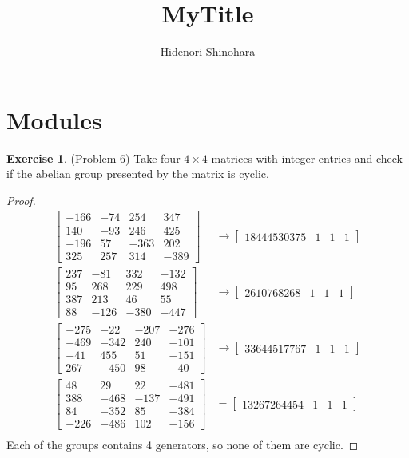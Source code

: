 \documentclass[12pt, psamsfonts]{amsart}
\theoremstyle{definition}
\newtheorem*{exer}{Exercise}
\theoremstyle{remark}
\numberwithin{equation}{section}
\begin{document}
\title{MyTitle}
\author{Hidenori Shinohara}
\maketitle

\tableofcontents

\section{Modules}

\begin{exer}{(Problem 6)}
  Take four $4 \times 4$ matrices with integer entries and check if the abelian group presented by the matrix is cyclic.
\end{exer}

\begin{proof}
  \begin{align*}
    \begin{bmatrix} -166 & -74 & 254 & 347\\ 140 & -93 & 246 & 425\\ -196 & 57 & -363 & 202\\ 325 & 257 & 314 & -389 \end{bmatrix}
      &\rightarrow \begin{bmatrix} 18444530375 & 1 & 1 & 1 \end{bmatrix} \\
    \begin{bmatrix} 237 & -81 & 332 & -132\\ 95 & 268 & 229 & 498\\ 387 & 213 & 46 & 55\\ 88 & -126 & -380 & -447 \end{bmatrix}
      &\rightarrow \begin{bmatrix} 2610768268 & 1 & 1 & 1 \end{bmatrix} \\
    \begin{bmatrix} -275 & -22 & -207 & -276\\ -469 & -342 & 240 & -101\\ -41 & 455 & 51 & -151\\ 267 & -450 & 98 & -40 \end{bmatrix}
      &\rightarrow \begin{bmatrix} 33644517767 & 1 & 1 & 1 \end{bmatrix} \\
    \begin{bmatrix} 48 & 29 & 22 & -481\\ 388 & -468 & -137 & -491\\ 84 & -352 & 85 & -384\\ -226 & -486 & 102 & -156 \end{bmatrix}
       &= \begin{bmatrix} 13267264454 & 1 & 1 & 1 \end{bmatrix} \\
  \end{align*}
  Each of the groups contains 4 generators, so none of them are cyclic.
\end{proof}
\end{document}
